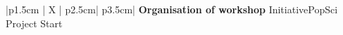 %
\iftrue %
\begin{myTableEnv}{|p{1.5cm} | X | p{2.5cm}| p{3.5cm}|}
    \myRow
        {}
        {\bfseries Organisation of workshop}
        {Initiative}{PopSci Project}
    \myRow
        {Start}{}
        {}{}
\end{myTableEnv}
%
\fi
%